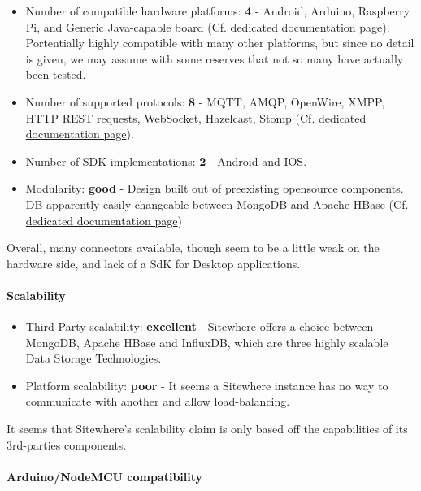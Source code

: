 \documentclass{article}
\begin{document}
\begin{itemize}
\item Number of compatible hardware platforms: \textbf{4} - Android, Arduino, Raspberry Pi, and Generic Java-capable board (Cf. \href{http://documentation.sitewhere.io/integration.html}{dedicated documentation page}). Portentially highly compatible with many other platforms, but since no detail is given, we may assume with some reserves that not so many have actually been tested.
\item Number of supported protocols: \textbf{8} - MQTT, AMQP, OpenWire, XMPP, HTTP REST requests, WebSocket, Hazelcast, Stomp (Cf. \href{http://documentation.sitewhere.io/userguide/tenant/device-communication.html}{dedicated documentation page}).
\item Number of SDK implementations: \textbf{2} - Android and IOS.
\item Modularity: \textbf{good} - Design built out of preexisting opensource components. DB apparently easily changeable between MongoDB and Apache HBase (Cf. \href{http://documentation.sitewhere.io/architecture.html}{dedicated documentation page})
\end{itemize}

Overall, many connectors available, though seem to be a little weak on the hardware side, and lack of a SdK for Desktop applications.

\paragraph{Scalability}

\begin{itemize}
\item Third-Party scalability: \textbf{excellent} - Sitewhere offers a choice between MongoDB, Apache HBase and InfluxDB, which are three highly scalable Data Storage Technologies.
\item Platform scalability: \textbf{poor} - It seems a Sitewhere instance has no way to communicate with another and allow load-balancing.
\end{itemize}

It seems that Sitewhere's scalability claim is only based off the capabilities of its 3rd-parties components.

\paragraph{Arduino/NodeMCU compatibility}
\end{document}
